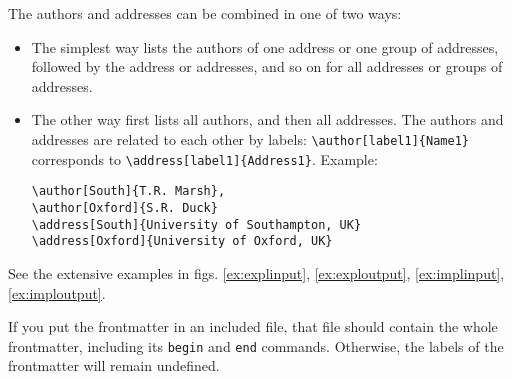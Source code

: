 \documentclass{elsart}
\begin{document}
The authors and addresses can be combined in one of two ways:
\begin{itemize}
\item The simplest way lists the authors of one address or one group
  of addresses, followed by the address or addresses, and so on for
  all addresses or groups of addresses.
\item The other way first lists all authors, and then all addresses.
The authors and addresses are related to each other by labels:
\verb|\author[label1]{Name1}| corresponds to
\verb|\address[label1]{Address1}|. Example:
\begin{verbatim}
\author[South]{T.R. Marsh},
\author[Oxford]{S.R. Duck}
\address[South]{University of Southampton, UK}
\address[Oxford]{University of Oxford, UK}
\end{verbatim}
\end{itemize}

See the extensive examples in figs.
\ref{ex:explinput}, \ref{ex:exploutput}, 
\ref{ex:implinput}, \ref{ex:imploutput}.

If you put the frontmatter in an included file, that file should
contain the whole frontmatter, including its \texttt{begin} and
\texttt{end} commands. Otherwise, the labels of the frontmatter will
remain undefined.

\end{document}
